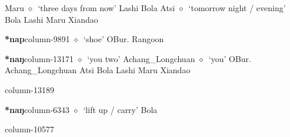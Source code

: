 \hspace{1ex}
         Maru 
\hspace{1ex}
         $\diamond$~`three days from now'
         Lashi 
\hspace{1ex}
         Bola 
\hspace{1ex}
         Atsi 
\hspace{1ex}
         $\diamond$~`tomorrow night / evening'
         Bola 
\hspace{1ex}
         Lashi 
\hspace{1ex}
         Maru 
\hspace{1ex}
         Xiandao 
  \item {\footnotesize \textbf{*nap}}{\tiny column-9891}
         $\diamond$~`shoe'
         OBur. 
\hspace{1ex}
         Rangoon 
  \item {\footnotesize \textbf{*naŋ}}{\tiny column-13171}
         $\diamond$~`you two'
         Achang\_Longchuan 
\hspace{1ex}
         $\diamond$~`you'
         OBur. 
\hspace{1ex}
         Achang\_Longchuan 
\hspace{1ex}
         Atsi 
\hspace{1ex}
         Bola 
\hspace{1ex}
         Lashi 
\hspace{1ex}
         Maru 
\hspace{1ex}
         Xiandao 
  \item {\footnotesize \textbf{}}{\tiny column-13189}
  \item {\footnotesize \textbf{*naŋ}}{\tiny column-6343}
         $\diamond$~`lift up / carry'
         Bola 
  \item {\footnotesize \textbf{}}{\tiny column-10577}
